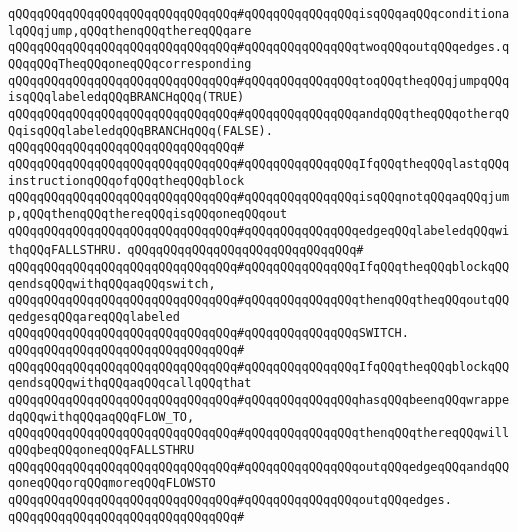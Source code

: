\verb|qQQqqQQqqQQqqQQqqQQqqQQqqQQqqQQq#qQQqqQQqqQQqqQQqisqQQqaqQQqconditionalqQQqjump,qQQqthenqQQqthereqQQqare|\newline
\verb|qQQqqQQqqQQqqQQqqQQqqQQqqQQqqQQq#qQQqqQQqqQQqqQQqtwoqQQqoutqQQqedges.qQQqqQQqTheqQQqoneqQQqcorresponding|\newline
\verb|qQQqqQQqqQQqqQQqqQQqqQQqqQQqqQQq#qQQqqQQqqQQqqQQqtoqQQqtheqQQqjumpqQQqisqQQqlabeledqQQqBRANCHqQQq(TRUE)|\newline
\verb|qQQqqQQqqQQqqQQqqQQqqQQqqQQqqQQq#qQQqqQQqqQQqqQQqandqQQqtheqQQqotherqQQqisqQQqlabeledqQQqBRANCHqQQq(FALSE).|\newline
\verb|qQQqqQQqqQQqqQQqqQQqqQQqqQQqqQQq#|\newline
\verb|qQQqqQQqqQQqqQQqqQQqqQQqqQQqqQQq#qQQqqQQqqQQqqQQqIfqQQqtheqQQqlastqQQqinstructionqQQqofqQQqtheqQQqblock|\newline
\verb|qQQqqQQqqQQqqQQqqQQqqQQqqQQqqQQq#qQQqqQQqqQQqqQQqisqQQqnotqQQqaqQQqjump,qQQqthenqQQqthereqQQqisqQQqoneqQQqout|\newline
\verb|qQQqqQQqqQQqqQQqqQQqqQQqqQQqqQQq#qQQqqQQqqQQqqQQqedgeqQQqlabeledqQQqwithqQQqFALLSTHRU.|\newline
\verb|qQQqqQQqqQQqqQQqqQQqqQQqqQQqqQQq#|\newline
\verb|qQQqqQQqqQQqqQQqqQQqqQQqqQQqqQQq#qQQqqQQqqQQqqQQqIfqQQqtheqQQqblockqQQqendsqQQqwithqQQqaqQQqswitch,|\newline
\verb|qQQqqQQqqQQqqQQqqQQqqQQqqQQqqQQq#qQQqqQQqqQQqqQQqthenqQQqtheqQQqoutqQQqedgesqQQqareqQQqlabeled|\newline
\verb|qQQqqQQqqQQqqQQqqQQqqQQqqQQqqQQq#qQQqqQQqqQQqqQQqSWITCH.|\newline
\verb|qQQqqQQqqQQqqQQqqQQqqQQqqQQqqQQq#|\newline
\verb|qQQqqQQqqQQqqQQqqQQqqQQqqQQqqQQq#qQQqqQQqqQQqqQQqIfqQQqtheqQQqblockqQQqendsqQQqwithqQQqaqQQqcallqQQqthat|\newline
\verb|qQQqqQQqqQQqqQQqqQQqqQQqqQQqqQQq#qQQqqQQqqQQqqQQqhasqQQqbeenqQQqwrappedqQQqwithqQQqaqQQqFLOW_TO,|\newline
\verb|qQQqqQQqqQQqqQQqqQQqqQQqqQQqqQQq#qQQqqQQqqQQqqQQqthenqQQqthereqQQqwillqQQqbeqQQqoneqQQqFALLSTHRU|\newline
\verb|qQQqqQQqqQQqqQQqqQQqqQQqqQQqqQQq#qQQqqQQqqQQqqQQqoutqQQqedgeqQQqandqQQqoneqQQqorqQQqmoreqQQqFLOWSTO|\newline
\verb|qQQqqQQqqQQqqQQqqQQqqQQqqQQqqQQq#qQQqqQQqqQQqqQQqoutqQQqedges.|\newline
\verb|qQQqqQQqqQQqqQQqqQQqqQQqqQQqqQQq#|\newline
